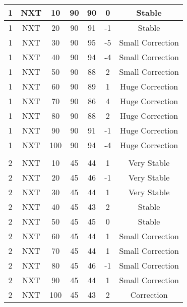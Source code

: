 \begin{longtable}[c]{|ccccccc|}
1  & NXT   & 10    & 90    & 90                & 0          & Stable                  \\\hline
1  & NXT   & 20    & 90    & 91                & -1         & Stable                  \\\hline
1  & NXT   & 30    & 90    & 95                & -5         & Small Correction        \\\hline
1  & NXT   & 40    & 90    & 94                & -4         & Small Correction        \\\hline
1  & NXT   & 50    & 90    & 88                & 2          & Small Correction        \\\hline
1  & NXT   & 60    & 90    & 89                & 1          & Huge Correction         \\\hline
1  & NXT   & 70    & 90    & 86                & 4          & Huge Correction         \\\hline
1  & NXT   & 80    & 90    & 88                & 2          & Huge Correction         \\\hline
1  & NXT   & 90    & 90    & 91                & -1         & Huge Correction         \\\hline
1  & NXT   & 100   & 90    & 94                & -4         & Huge Correction         \\\hline
   &       &       &       &                   &            &                         \\\hline
2  & NXT  & 10     & 45    & 44                & 1          & Very Stable             \\\hline
2  & NXT  & 20     & 45    & 46                & -1         & Very Stable             \\\hline
2  & NXT  & 30     & 45    & 44                & 1          & Very Stable             \\\hline
2  & NXT  & 40     & 45    & 43                & 2          & Stable                  \\\hline
2  & NXT  & 50     & 45    & 45                & 0          & Stable                  \\\hline
2  & NXT  & 60     & 45    & 44                & 1          & Small Correction        \\\hline
2  & NXT  & 70     & 45    & 44                & 1          & Small Correction        \\\hline
2  & NXT  & 80     & 45    & 46                & -1         & Small Correction        \\\hline
2  & NXT  & 90     & 45    & 44                & 1          & Small Correction        \\\hline
2  & NXT  & 100    & 45    & 43                & 2          & Correction              \\\hline


\end{longtable}

